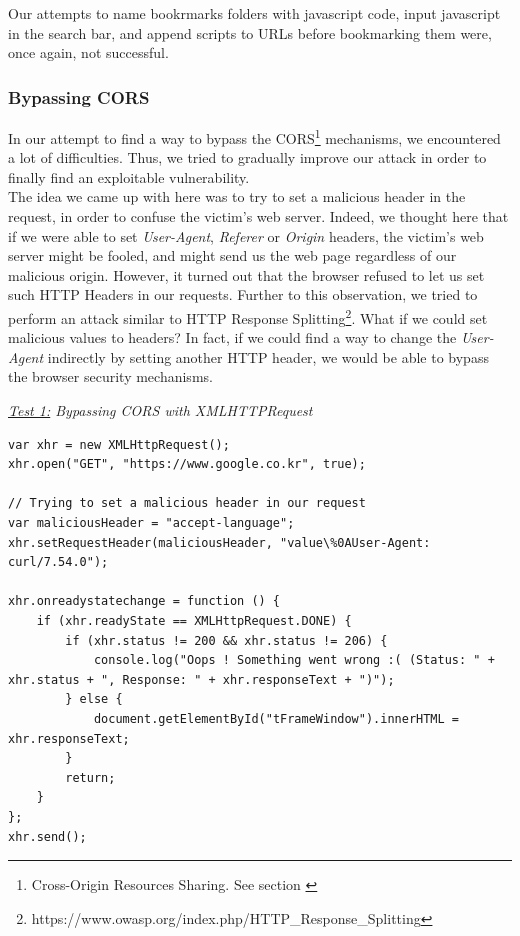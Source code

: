 \documentclass[journal]{IEEEtran}
\begin{document}
Our attempts to name bookrmarks folders with javascript code, input javascript in the search bar, and append scripts to URLs before bookmarking them were, once again, not successful.


\subsubsection*{Bypassing CORS}

In our attempt to find a way to bypass the CORS\footnote{Cross-Origin Resources Sharing. See section \label{CORSSection}} mechanisms, we encountered a lot of difficulties. Thus, we tried to gradually improve our attack in order to finally find an exploitable vulnerability. \\
The idea we came up with here was to try to set a malicious header in the request, in order to confuse the victim's web server. Indeed, we thought here that if we were able to set \emph{User-Agent}, \emph{Referer} or \emph{Origin} headers, the victim's web server might be fooled, and might send us the web page regardless of our malicious origin. However, it turned out that the browser refused to let us set such HTTP Headers in our requests. Further to this observation, we tried to perform an attack similar to HTTP Response Splitting\footnote{https://www.owasp.org/index.php/HTTP\_Response\_Splitting}. What if we could set malicious values to headers? In fact, if we could find a way to change the \emph{User-Agent} indirectly by setting another HTTP header, we would be able to bypass the browser security mechanisms.

\medskip

\emph{\underline{Test 1:} Bypassing CORS with XMLHTTPRequest} \\
\begin{lstlisting}[caption=Trying to set malicious headers with XMLHTTPRequest]
var xhr = new XMLHttpRequest();
xhr.open("GET", "https://www.google.co.kr", true);

// Trying to set a malicious header in our request
var maliciousHeader = "accept-language";
xhr.setRequestHeader(maliciousHeader, "value\%0AUser-Agent: curl/7.54.0");

xhr.onreadystatechange = function () {
    if (xhr.readyState == XMLHttpRequest.DONE) {
        if (xhr.status != 200 && xhr.status != 206) {
            console.log("Oops ! Something went wrong :( (Status: " + xhr.status + ", Response: " + xhr.responseText + ")");
        } else {
            document.getElementById("tFrameWindow").innerHTML = xhr.responseText;
        }
        return;
    }
};
xhr.send();
\end{lstlisting}
\end{document}
